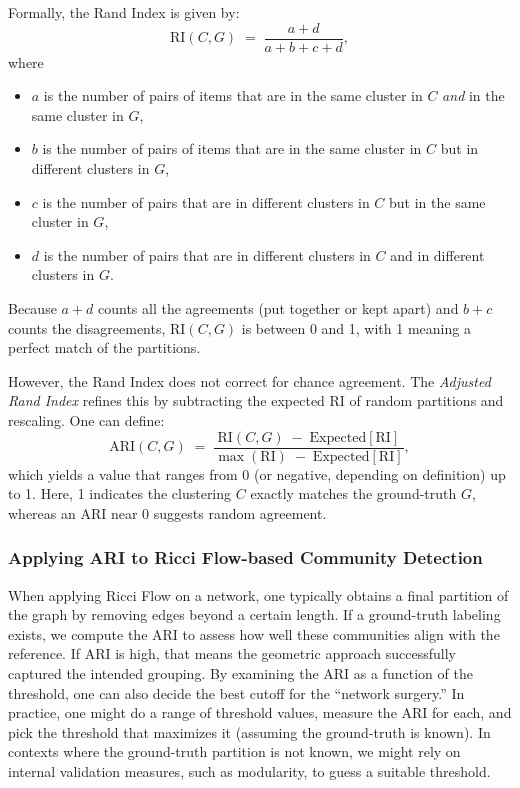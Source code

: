 Formally, the Rand Index is given by:
\[
\mathrm{RI}(C,G) \;=\; \frac{a + d}{a + b + c + d},
\]
where 
\begin{itemize}
    \item $a$ is the number of pairs of items that are in the same cluster in $C$ \emph{and} in the same cluster in $G$,
    \item $b$ is the number of pairs of items that are in the same cluster in $C$ but in different clusters in $G$,
    \item $c$ is the number of pairs that are in different clusters in $C$ but in the same cluster in $G$,
    \item $d$ is the number of pairs that are in different clusters in $C$ and in different clusters in $G$.
\end{itemize}
Because $a+d$ counts all the agreements (put together or kept apart) and $b+c$ counts the disagreements, $\mathrm{RI}(C,G)$ is between 0 and 1, with 1 meaning a perfect match of the partitions.

However, the Rand Index does not correct for chance agreement. The \emph{Adjusted Rand Index} refines this by subtracting the expected RI of random partitions and rescaling. One can define:
\[
\mathrm{ARI}(C,G) \;=\; \frac{\mathrm{RI}(C,G)\;-\;\mathrm{Expected}[\mathrm{RI}]}{\max(\mathrm{RI})\;-\;\mathrm{Expected}[\mathrm{RI}]},
\]
which yields a value that ranges from 0 (or negative, depending on definition) up to 1. Here, 1 indicates the clustering $C$ exactly matches the ground-truth $G$, whereas an ARI near 0 suggests random agreement.

\subsubsection{Applying ARI to Ricci Flow-based Community Detection}
When applying Ricci Flow on a network, one typically obtains a final partition of the graph by removing edges beyond a certain length. If a ground-truth labeling exists, we compute the ARI to assess how well these communities align with the reference. If $\mathrm{ARI}$ is high, that means the geometric approach successfully captured the intended grouping. By examining the ARI as a function of the threshold, one can also decide the best cutoff for the “network surgery.” In practice, one might do a range of threshold values, measure the ARI for each, and pick the threshold that maximizes it (assuming the ground-truth is known). In contexts where the ground-truth partition is not known, we might rely on internal validation measures, such as modularity, to guess a suitable threshold.

